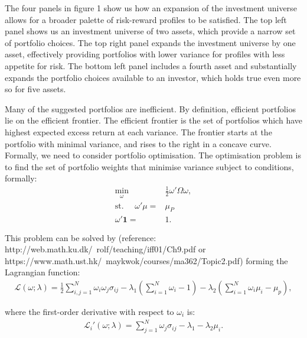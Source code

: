 \documentclass[11pt,a4paper,oneside]{article}
\newcommand{\lll}{\mathcal{L}}
\newcommand{\lp}{\left(}
\newcommand{\rp}{\right)}
\begin{document}
The four panels in figure 1 show us how an expansion of the investment universe allows for a broader palette of risk-reward profiles to be satisfied. The top left panel shows us an investment universe of two assets, which provide a narrow set of portfolio choices. The top right panel expands the investment universe by one asset, effectively providing portfolios with lower variance for profiles with less appetite for risk. The bottom left panel includes a fourth asset and substantially expands the portfolio choices available to an investor, which holds true even more so for five assets.

Many of the suggested portfolios are inefficient. By definition, efficient portfolios lie on the efficient frontier. The efficient frontier is the set of portfolios which have highest expected excess return at each variance. The frontier starts at the portfolio with minimal variance, and rises to the right in a concave curve. Formally, we need to consider portfolio optimisation. The optimisation problem is to find the set of portfolio weights that minimise variance subject to conditions, formally:
\begin{align}
    \min_\omega \ & \frac{1}{2} \omega'\Omega\omega,\\
    \text{st. }\quad \omega'\mu =& \mu_P \\
        \omega'\mathbf{1} =& 1.
\end{align}

This problem can be solved by (reference: http://web.math.ku.dk/~rolf/teaching/iff01/Ch9.pdf or https://www.math.ust.hk/~maykwok/courses/ma362/Topic2.pdf) forming the Lagrangian function:
\begin{align}
    \lll\lp \omega; \lambda\rp = \frac{1}{2}\sum_{i,j=1}^N \omega_i \omega_j \sigma_{ij} - \lambda_1\lp \sum_{i=1}^N\omega_i - 1\rp - \lambda_2 \lp \sum_{i=1}^N \omega_i \mu_i - \mu_p\rp,
\end{align}

where the first-order derivative with respect to $\omega_i$ is:
\begin{align}
    \lll_i'\lp \omega;\lambda\rp = \sum_{j=1}^N\omega_j\sigma_{ij} - \lambda_1 - \lambda_2 \mu_i.
\end{align}
\end{document}
